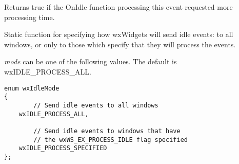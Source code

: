 
Returns true if the OnIdle function processing this event requested more processing time.



\label{wxidleeventsetmode}


Static function for specifying how wxWidgets will send idle events: to
all windows, or only to those which specify that they
will process the events.

{\it mode} can be one of the following values.
The default is wxIDLE\_PROCESS\_ALL.

\begin{verbatim}
enum wxIdleMode
{
        // Send idle events to all windows
    wxIDLE_PROCESS_ALL,

        // Send idle events to windows that have
        // the wxWS_EX_PROCESS_IDLE flag specified
    wxIDLE_PROCESS_SPECIFIED
};
\end{verbatim}

